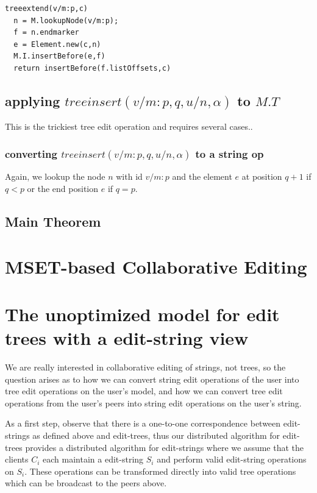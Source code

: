 \documentclass{amsart}
\begin{document}
\begin{verbatim}
treeextend(v/m:p,c)
  n = M.lookupNode(v/m:p);
  f = n.endmarker
  e = Element.new(c,n)
  M.I.insertBefore(e,f)
  return insertBefore(f.listOffsets,c)
\end{verbatim}

\subsection{applying $treeinsert(v/m:p,q,u/n,\alpha)$ to $M.T$}
This is the trickiest tree edit operation and requires several cases..

\subsubsection{converting $treeinsert(v/m:p,q,u/n,\alpha)$ to a string op}
Again, we lookup the node $n$ with id $v/m:p$ and the element $e$ at position $q+1$ if $q<p$ or the end position $e$ if $q=p$. 


\subsection{Main Theorem}

\section{MSET-based Collaborative Editing}








\section{The unoptimized model for edit trees with a edit-string view}
We are really interested in collaborative editing of strings, not trees, so the
question arises as to how we can convert string edit operations of the user
into tree edit operations on the user's model, and how we can convert tree edit
operations from the user's peers into string edit operations on the user's string.

As a first step, observe that there is a one-to-one correspondence between
edit-strings as defined above and edit-trees, thus our distributed algorithm
for edit-trees provides a distributed algorithm for edit-strings where we
assume that the clients $C_i$ each maintain a edit-string $S_i$ and perform valid
edit-string operations on $S_i$. These operations can be transformed directly
into valid tree operations which can be broadcast to the peers above. 
\end{document}
